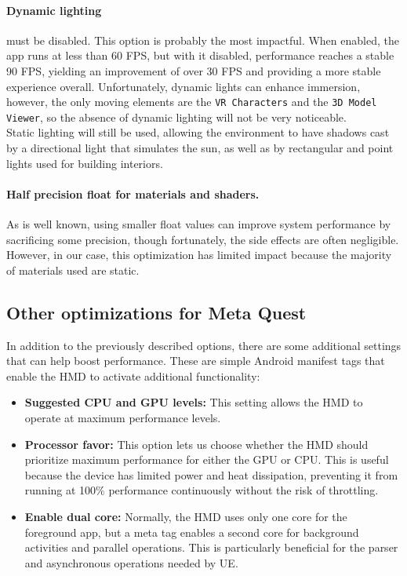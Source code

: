 \paragraph{Dynamic lighting}
must be disabled. This option is probably the most impactful. When enabled, the app runs at less than 60 \ac{FPS}, but with it disabled, performance reaches a stable 90 \ac{FPS}, yielding an improvement of over 30 \ac{FPS} and providing a more stable experience overall.
Unfortunately, dynamic lights can enhance immersion, however, the only moving elements are the \texttt{VR Characters} and the \texttt{3D Model Viewer}, so the absence of dynamic lighting will not be very noticeable.\\
Static lighting will still be used, allowing the environment to have shadows cast by a directional light that simulates the sun, as well as by rectangular and point lights used for building interiors.

\paragraph{Half precision float for materials and shaders.}
As is well known, using smaller float values can improve system performance by sacrificing some precision, though fortunately, the side effects are often negligible.
However, in our case, this optimization has limited impact because the majority of materials used are static.

\subsection{Other optimizations for Meta Quest}
\noindent
In addition to the previously described options, there are some additional settings that can help boost performance. These are simple Android manifest tags that enable the \ac{HMD} to activate additional functionality:

\begin{itemize}
  \item \textbf{Suggested CPU and GPU levels:} This setting allows the \ac{HMD} to operate at maximum performance levels.
  \item \textbf{Processor favor:} This option lets us choose whether the \ac{HMD} should prioritize maximum performance for either the GPU or CPU. This is useful because the device has limited power and heat dissipation, preventing it from running at 100\% performance continuously without the risk of throttling.
  \item \textbf{Enable dual core:} Normally, the \ac{HMD} uses only one core for the foreground app, but a meta tag enables a second core for background activities and parallel operations. This is particularly beneficial for the parser and asynchronous operations needed by \ac{UE}.
\end{itemize}

